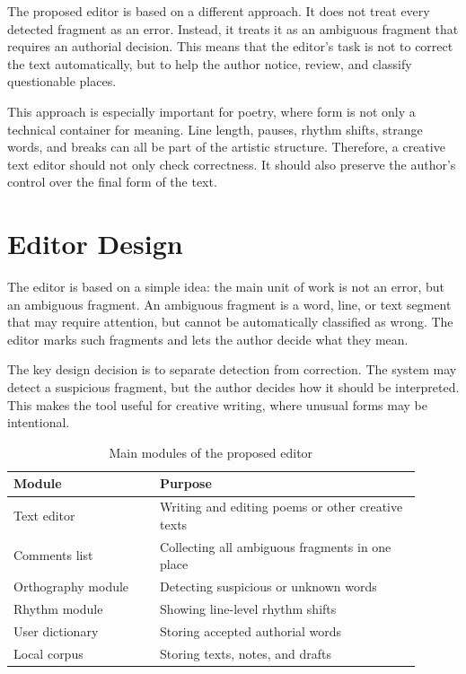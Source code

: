 \documentclass[sigconf]{acmart}
\begin{document}
The proposed editor is based on a different approach. It does not treat every detected fragment as an error. Instead, it treats it as an ambiguous fragment that requires an authorial decision. This means that the editor's task is not to correct the text automatically, but to help the author notice, review, and classify questionable places.

This approach is especially important for poetry, where form is not only a technical container for meaning. Line length, pauses, rhythm shifts, strange words, and breaks can all be part of the artistic structure. Therefore, a creative text editor should not only check correctness. It should also preserve the author's control over the final form of the text.

\section{Editor Design}

The editor is based on a simple idea: the main unit of work is not an error, but an ambiguous fragment. An ambiguous fragment is a word, line, or text segment that may require attention, but cannot be automatically classified as wrong. The editor marks such fragments and lets the author decide what they mean.

The key design decision is to separate detection from correction. The system may detect a suspicious fragment, but the author decides how it should be interpreted. This makes the tool useful for creative writing, where unusual forms may be intentional.

\begin{table}[h]
\caption{Main modules of the proposed editor}
\label{tab:modules}
\begin{tabular}{p{0.32\linewidth}p{0.58\linewidth}}
\toprule
Module & Purpose \\
\midrule
Text editor & Writing and editing poems or other creative texts \\
Comments list & Collecting all ambiguous fragments in one place \\
Orthography module & Detecting suspicious or unknown words \\
Rhythm module & Showing line-level rhythm shifts \\
User dictionary & Storing accepted authorial words \\
Local corpus & Storing texts, notes, and drafts \\
\bottomrule
\end{tabular}
\end{table}
\end{document}
